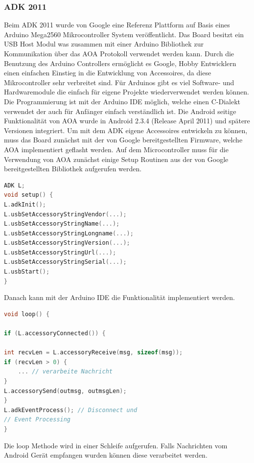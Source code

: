 \documentclass[12pt,journal,compsoc]{IEEEtran}
\begin{document}
\subsubsection{ADK 2011}
Beim ADK 2011 wurde von Google eine
Referenz Plattform auf Basis eines Arduino Mega2560 Mikrocontroller System veröffentlicht. Das Board besitzt ein USB Host Modul was zusammen mit einer Arduino Bibliothek zur Kommunikation über das AOA Protokoll verwendet werden kann.
Durch die Benutzung des Arduino Controllers ermöglicht es Google, Hobby Entwicklern einen einfachen Einstieg in die Entwicklung von Accessoires, da diese Mikrocontroller sehr verbreitet sind.
Für Arduinos gibt es viel Software- und Hardwaremodule die einfach für eigene Projekte wiederverwendet werden können.
Die Programmierung ist mit der Arduino IDE möglich, welche einen C-Dialekt verwendet der auch für Anfänger einfach verständlich ist.
Die Android seitige Funktionalität von AOA wurde in Android 2.3.4 (Release April 2011) und spätere Versionen integriert. 
Um mit dem ADK eigene Accessoires entwickeln zu können, muss das Board zunächst mit der von Google bereitgestellten Firmware, welche AOA implementiert geflasht werden.
Auf dem Microcontroller muss für die Verwendung von AOA zunächst einige Setup Routinen aus der von Google bereitgestellten Bibliothek aufgerufen werden.

\begin{lstlisting}[language=C]
ADK L;
void setup() {
L.adkInit();
L.usbSetAccessoryStringVendor(...);
L.usbSetAccessoryStringName(...);
L.usbSetAccessoryStringLongname(...);
L.usbSetAccessoryStringVersion(...);
L.usbSetAccessoryStringUrl(...);
L.usbSetAccessoryStringSerial(...);
L.usbStart();
}
\end{lstlisting}

Danach kann mit der Arduino IDE die Funktionalität implementiert werden.

\begin{lstlisting}[language=C]
void loop() {

if (L.accessoryConnected()) {

int recvLen = L.accessoryReceive(msg, sizeof(msg));
if (recvLen > 0) {
	... // verarbeite Nachricht 
}
L.accessorySend(outmsg, outmsgLen);
}
L.adkEventProcess(); // Disconnect und 
// Event Processing
}
\end{lstlisting}

Die loop Methode wird in einer Schleife aufgerufen. Falls Nachrichten vom Android Gerät empfangen wurden können diese verarbeitet werden.
\end{document}
